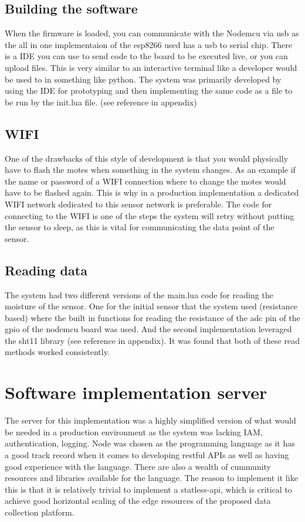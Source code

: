 \documentclass[]{uiophd}
\begin{document}
\subsection{Building the software}
When the firmware is loaded, you can communicate with the Nodemcu via usb as the all in one implementaion of the esp8266 used has a usb to serial chip. There is a IDE you can use to send code to the board to be executed live, or you can upload files. This is very similar to an interactive terminal like a developer would be used to in something like python. The system was primarily developed by using the IDE for prototyping and then implementing the same code as a file to be run by the init.lua file. (see reference in appendix)
\subsection{WIFI}
One of the drawbacks of this style of development is that you would physically have to flash the motes when something in the system changes. As an example if the name or password of a WIFI connection where to change the motes would have to be flashed again. This is why in a production implementation a dedicated WIFI network dedicated to this sensor network is preferable. The code for connecting to the WIFI is one of the steps the system will retry without putting the sensor to sleep, as this is vital for communicating the data point of the sensor.
\subsection{Reading data}
The system had two different versions of the main.lua code for reading the moisture of the sensor. One for the initial sensor that the system used (resistance based) where the built in functions for reading the resistance of the adc pin of the gpio of the nodemcu board was used. And the second implementation leveraged the sht11 library (see reference in appendix). It was found that both of these read methods worked consistently.
\section{Software implementation server}
The server for this implementation was a highly simplified version of what would be needed in a production environment as the system was lacking IAM, authentication, logging. Node was chosen as the programming language as it has a good track record when it comes to developing restful APIs as well as having good experience with the language. There are also a wealth of cummunity resources and libraries available for the language. The reason to implement it like this is that it is relatively trivial to implement a statless-api, which is critical to achieve good horizontal scaling of the edge resources of the proposed data collection platform.
\end{document}
